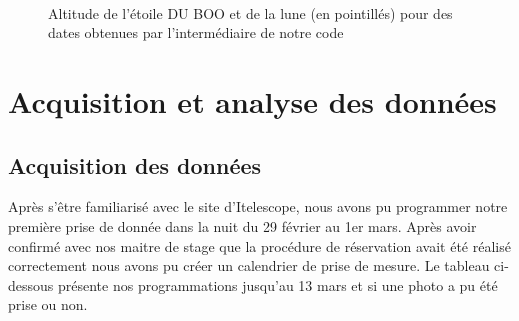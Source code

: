 \documentclass[10pt,french, openany]{book}
\begin{document}
\begin{figure}[t]
                 \\
                
            \caption{Altitude de l'étoile DU BOO et de la lune (en pointillés) pour des dates obtenues par l'intermédiaire de notre code}
            
            \label{fig:staralt}
            
        \end{figure}
\chapter{Acquisition et analyse des données}\label{chapt:doe}

\section{Acquisition des données}
Après s'être familiarisé avec le site d'Itelescope, nous avons pu programmer notre première prise de donnée dans la nuit du 29 février au 1er mars. Après avoir confirmé avec nos maitre de stage que la procédure de réservation avait été réalisé correctement nous avons pu créer un calendrier de prise de mesure. Le tableau ci-dessous présente nos programmations jusqu'au 13 mars et si une photo a pu été prise ou non. 
\end{document}
